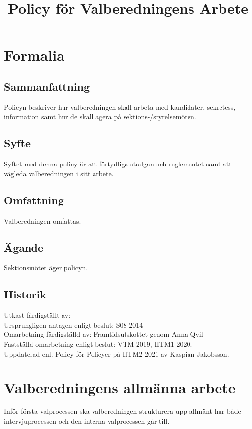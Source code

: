 \documentclass{dsekprotokoll}
\title{Policy för Valberedningens Arbete}
\author{}
\begin{document}
\maketitle

\section{Formalia}
\subsection{Sammanfattning}
Policyn beskriver hur valberedningen skall arbeta med kandidater, sekretess, information samt
hur de skall agera på sektions-/styrelsemöten.

\subsection{Syfte}
Syftet med denna policy är att förtydliga stadgan och reglementet samt att vägleda valberedningen i sitt arbete.

\subsection{Omfattning}
Valberedningen omfattas.

\subsection{Ägande}
Sektionsmötet äger policyn.
\subsection{Historik}
Utkast färdigställt av: – \\
Ursprungligen antagen enligt beslut: S08 2014\\
Omarbetning färdigställd av: Framtidsutskottet genom Anna Qvil\\
Fastställd omarbetning enligt beslut: VTM 2019, HTM1 2020. \\
Uppdaterad enl. Policy för Policyer på HTM2 2021 av Kaspian Jakobsson.


\section{Valberedningens allmänna arbete}

Inför första valprocessen ska valberedningen strukturera upp allmänt hur både intervjuprocessen och den
interna valprocessen går till.
\end{document}
